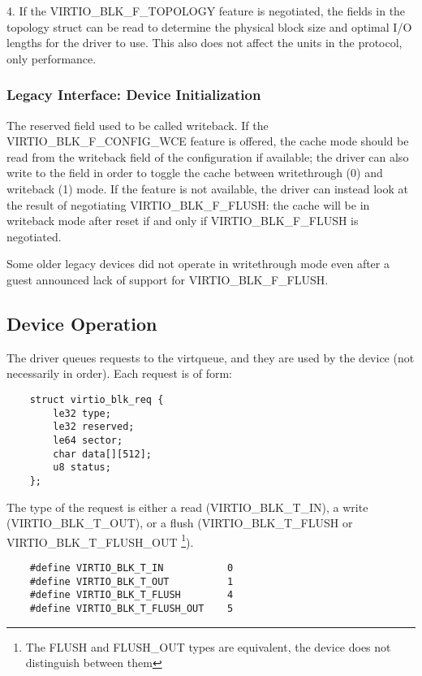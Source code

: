 4. If the VIRTIO_BLK_F_TOPOLOGY feature is negotiated, the fields in the
  topology struct can be read to determine the physical block size and optimal
  I/O lengths for the driver to use. This also does not affect the units
  in the protocol, only performance.

\subsubsection{Legacy Interface: Device Initialization}\label{sec:Device Types / Block Device / Device Initialization / Legacy Interface: Device Initialization}

The reserved field used to be called writeback.  If the
VIRTIO_BLK_F_CONFIG_WCE feature is offered, the cache mode should be
read from the writeback field of the configuration if available; the
driver can also write to the field in order to toggle the cache
between writethrough (0) and writeback (1) mode.  If the feature is
not available, the driver can instead look at the result of
negotiating VIRTIO_BLK_F_FLUSH: the cache will be in writeback mode
after reset if and only if VIRTIO_BLK_F_FLUSH is negotiated.

Some older legacy devices did not operate in writethrough mode even
after a guest announced lack of support for VIRTIO_BLK_F_FLUSH.

\subsection{Device Operation}\label{sec:Device Types / Block Device / Device Operation}

The driver queues requests to the virtqueue, and they are used by
the device (not necessarily in order). Each request is of form:

\begin{lstlisting}
	struct virtio_blk_req {
		le32 type;
		le32 reserved;
		le64 sector;
		char data[][512];
		u8 status;
	};
\end{lstlisting}

The type of the request is either a read (VIRTIO_BLK_T_IN), a write
(VIRTIO_BLK_T_OUT), or a flush (VIRTIO_BLK_T_FLUSH or
VIRTIO_BLK_T_FLUSH_OUT
\footnote{The FLUSH and FLUSH_OUT types are equivalent, the device does not
distinguish between them
}).

\begin{lstlisting}
	#define VIRTIO_BLK_T_IN           0
	#define VIRTIO_BLK_T_OUT          1
	#define VIRTIO_BLK_T_FLUSH        4
	#define VIRTIO_BLK_T_FLUSH_OUT    5
\end{lstlisting}

